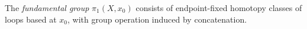 
The \emph{fundamental group} $\pi_1(X,x_0)$ consists of endpoint-fixed homotopy classes of loops based at $x_0$, with group operation induced by concatenation.
